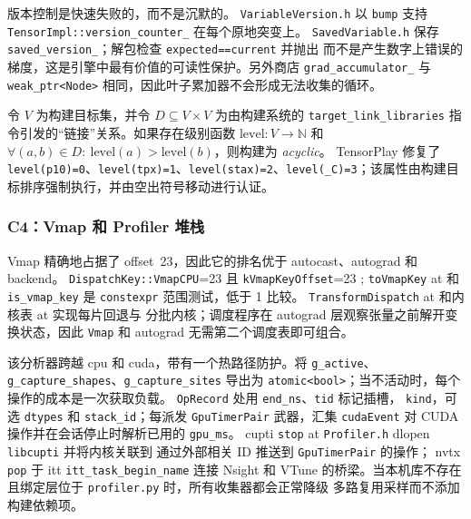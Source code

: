 版本控制是快速失败的，而不是沉默的。 \texttt{VariableVersion.h} 以 \texttt{bump} 支持 \texttt{TensorImpl::version\_counter\_}
 在每个原地突变上。 \texttt{SavedVariable.h} 保存 \texttt{saved\_version\_}；解包检查 \texttt{expected==current} 并抛出
而不是产生数字上错误的梯度，这是引擎中最有价值的可读性保护。另外商店
\texttt{grad\_accumulator\_} 与 \texttt{weak\_ptr<Node>} 相同，因此叶子累加器不会形成无法收集的循环。

\begin{tpdef}
令 $V$ 为构建目标集，并令 $D \subseteq V \times V$ 为由构建系统的 \texttt{target\_link\_libraries} 指令引发的“链接”关系。如果存在级别函数 $\mathrm{level}:V\rightarrow\mathbb{N}$ 和 $\forall(a,b)\in D:\ \mathrm{level}(a)>\mathrm{level}(b)$，则构建为 \emph{acyclic}。 TensorPlay 修复了 \texttt{level(p10)=0}、\texttt{level(tpx)=1}、\texttt{level(stax)=2}、\texttt{level(\_C)=3}；该属性由构建目标排序强制执行，并由空出符号移动进行认证。
\end{tpdef}

\subsubsection{C4：Vmap 和 Profiler 堆栈}
\label{sec:intro:c4}

Vmap 精确地占据了 offset~23，因此它的排名优于 autocast、autograd 和 backend。 \texttt{DispatchKey::VmapCPU}=23 且 \texttt{kVmapKeyOffset}=23
; \texttt{toVmapKey} at 和 \texttt{is\_vmap\_key} 是 \texttt{constexpr} 范围测试，低于 1
比较。 \texttt{TransformDispatch} at 和内核表 at 实现每片回退与
分批内核；调度程序在 autograd 层观察张量之前解开变换状态，因此 \texttt{Vmap} 和 autograd 无需第二个调度表即可组合。

该分析器跨越 \ac{cpu} 和 \ac{cuda}，带有一个热路径防护。将 \texttt{g\_active}、\texttt{g\_capture\_shapes}、\texttt{g\_capture\_sites} 导出为
\texttt{atomic<bool>}；当不活动时，每个操作的成本是一次获取负载。 \texttt{OpRecord} 处用 \texttt{end\_ns}、\texttt{tid} 标记插槽，
\texttt{kind}，可选 \texttt{dtypes} 和 \texttt{stack\_id}；每派发 \texttt{GpuTimerPair} 武器，汇集 \texttt{cudaEvent} 对
CUDA 操作并在会话停止时解析已用的 \texttt{gpu\_ms}。 \ac{cupti} \texttt{stop} at \texttt{Profiler.h} dlopen \texttt{libcupti} 并将内核关联到
通过外部相关 ID 推送到 \texttt{GpuTimerPair} 的操作； \ac{nvtx} \texttt{pop} 于 \ac{itt} \texttt{itt\_task\_begin\_name}
 连接 Nsight 和 VTune 的桥梁。当本机库不存在且绑定层位于 \texttt{profiler.py} 时，所有收集器都会正常降级
多路复用采样而不添加构建依赖项。

